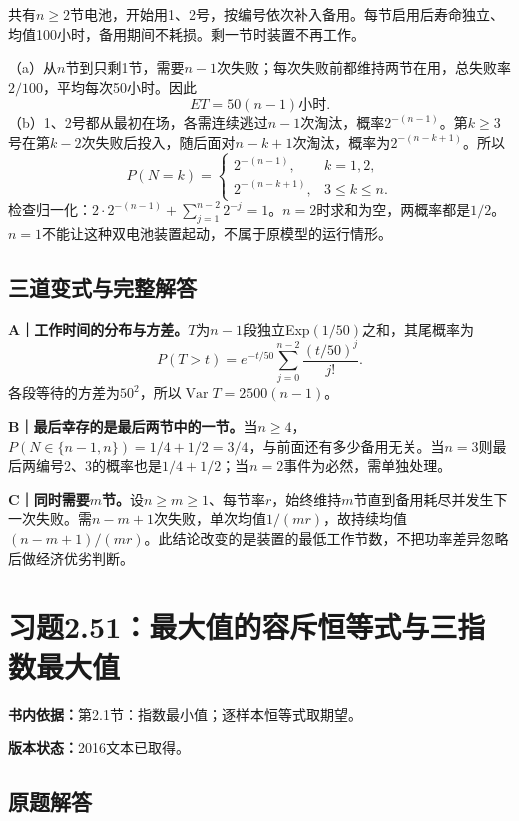 \documentclass[
  11pt,
  a4paper,
  UTF8,fontset=fandol]{ctexart}
\let\OldSection\section
\renewcommand{\section}{\Needspace{7\baselineskip}\OldSection}
\let\OldSubsection\subsection
\renewcommand{\subsection}{\Needspace{5\baselineskip}\OldSubsection}
\begin{document}
共有\(n\ge2\)节电池，开始用1、2号，按编号依次补入备用。每节启用后寿命独立、均值100小时，备用期间不耗损。剩一节时装置不再工作。

（a）从\(n\)节到只剩1节，需要\(n-1\)次失败；每次失败前都维持两节在用，总失败率\(2/100\)，平均每次50小时。因此
\[\boxed{ET=50(n-1)\text{小时}.}\]
（b）1、2号都从最初在场，各需连续逃过\(n-1\)次淘汰，概率\(2^{-(n-1)}\)。第\(k\ge3\)号在第\(k-2\)次失败后投入，随后面对\(n-k+1\)次淘汰，概率为\(2^{-(n-k+1)}\)。所以
\[\boxed{P(N=k)=\begin{cases}2^{-(n-1)},&k=1,2,\\2^{-(n-k+1)},&3\le k\le n.\end{cases}}\]
检查归一化：\(2\cdot2^{-(n-1)}+\sum_{j=1}^{n-2}2^{-j}=1\)。\(n=2\)时求和为空，两概率都是\(1/2\)。\(n=1\)不能让这种双电池装置起动，不属于原模型的运行情形。

\subsection{三道变式与完整解答}\label{ux4e09ux9053ux53d8ux5f0fux4e0eux5b8cux6574ux89e3ux7b54-49}

\textbf{A｜工作时间的分布与方差。}\(T\)为\(n-1\)段独立Exp\((1/50)\)之和，其尾概率为
\[P(T>t)=e^{-t/50}\sum_{j=0}^{n-2}\frac{(t/50)^j}{j!}.\]
各段等待的方差为\(50^2\)，所以\(\operatorname{Var}T=2500(n-1)\)。

\textbf{B｜最后幸存的是最后两节中的一节。}当\(n\ge4\)，\(P(N\in\{n-1,n\})=1/4+1/2=3/4\)，与前面还有多少备用无关。当\(n=3\)则最后两编号2、3的概率也是\(1/4+1/2\)；当\(n=2\)事件为必然，需单独处理。

\textbf{C｜同时需要\(m\)节。}设\(n\ge m\ge1\)、每节率\(r\)，始终维持\(m\)节直到备用耗尽并发生下一次失败。需\(n-m+1\)次失败，单次均值\(1/(mr)\)，故持续均值\((n-m+1)/(mr)\)。此结论改变的是装置的最低工作节数，不把功率差异忽略后做经济优劣判断。

\newpage

\section{习题2.51：最大值的容斥恒等式与三指数最大值}\label{ux4e60ux98982.51ux6700ux5927ux503cux7684ux5bb9ux65a5ux6052ux7b49ux5f0fux4e0eux4e09ux6307ux6570ux6700ux5927ux503c}

\textbf{书内依据：}第2.1节：指数最小值；逐样本恒等式取期望。

\textbf{版本状态：}2016文本已取得。

\subsection{原题解答}\label{ux539fux9898ux89e3ux7b54-50}
\end{document}
